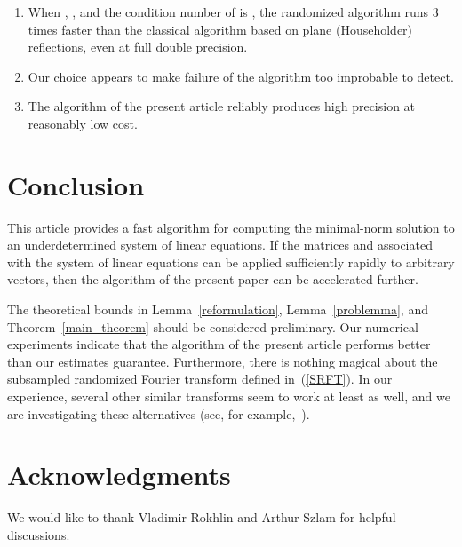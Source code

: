 \documentclass[letterpaper,12pt]{article}
\begin{document}
\begin{enumerate}
\item When , ,
and the condition number of  is ,
the randomized algorithm runs 3 times faster than the classical algorithm
based on plane (Householder) reflections, even at full double precision.
\item Our choice  appears to make failure of the algorithm
too improbable to detect.
\item The algorithm of the present article reliably produces high precision
at reasonably low cost.
\end{enumerate}



\section{Conclusion}
\label{conclusions}

This article provides a fast algorithm for computing the minimal-norm solution
to an underdetermined system of linear equations.
If the matrices  and 
associated with the system of linear equations
can be applied sufficiently rapidly to arbitrary vectors, then the algorithm
of the present paper can be accelerated further.

The theoretical bounds in Lemma~\ref{reformulation}, Lemma~\ref{problemma},
and Theorem~\ref{main_theorem} should be considered preliminary.
Our numerical experiments indicate that the algorithm
of the present article performs better than our estimates guarantee.
Furthermore, there is nothing magical
about the subsampled randomized Fourier transform defined in~(\ref{SRFT}).
In our experience, several other similar transforms seem
to work at least as well, and we are investigating these alternatives
(see, for example,~\cite{ailon-liberty}).



\section*{Acknowledgments}
We would like to thank Vladimir Rokhlin and Arthur Szlam
for helpful discussions.



\newpage




\end{document}
